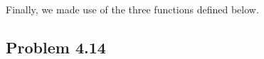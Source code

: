 \documentclass[../hw_sols.tex]{subfiles}
\begin{document}
\vspace{0.5cm}


\begin{solution}
Finally, we made use of the three functions defined below.


\end{solution}


\newpage



\subsection*{Problem 4.14}
\end{document}
